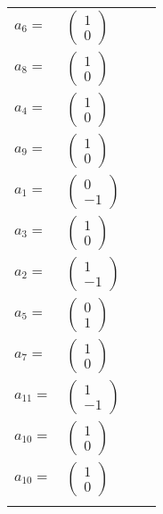 \documentclass[1p]{elsarticle_modified}
\theoremstyle{definition}
\begin{document}
\begin{tabular}{m{7pt} m{180pt} m{7pt} m{180pt} }
\flushright $a_{6}=$&$\begin{pmatrix}1\\0\end{pmatrix}$ \\
\flushright $a_{8}=$&$\begin{pmatrix}1\\0\end{pmatrix}$ \\
\flushright $a_{4}=$&$\begin{pmatrix}1\\0\end{pmatrix}$ \\
\flushright $a_{9}=$&$\begin{pmatrix}1\\0\end{pmatrix}$ \\
\flushright $a_{1}=$&$\begin{pmatrix}0\\-1\end{pmatrix}$ \\
\flushright $a_{3}=$&$\begin{pmatrix}1\\0\end{pmatrix}$ \\
\flushright $a_{2}=$&$\begin{pmatrix}1\\-1\end{pmatrix}$ \\
\flushright $a_{5}=$&$\begin{pmatrix}0\\1\end{pmatrix}$ \\
\flushright $a_{7}=$&$\begin{pmatrix}1\\0\end{pmatrix}$ \\
\flushright $a_{11}=$&$\begin{pmatrix}1\\-1\end{pmatrix}$ \\
\flushright $a_{10}=$&$\begin{pmatrix}1\\0\end{pmatrix}$\\ \flushright $a_{10}=$&$\begin{pmatrix}1\\0\end{pmatrix}$\\&\end{tabular}
\end{document}

